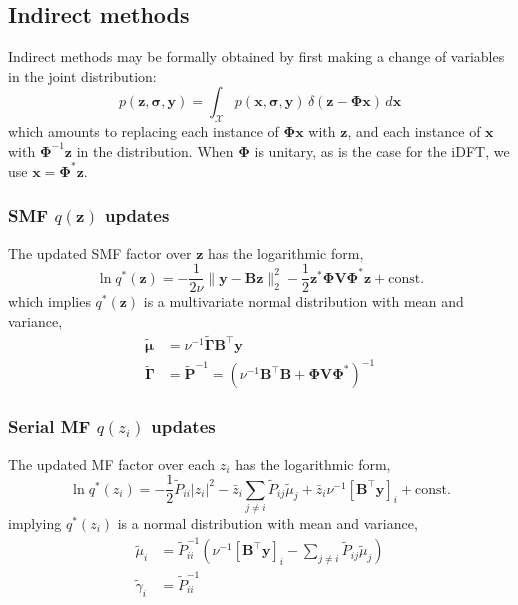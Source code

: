 \documentclass{article}
\newcommand{\m}[1]{\boldsymbol{#1}}
\begin{document}
\subsection{Indirect methods}
\label{ss:var_indirect}
Indirect methods may be formally obtained by first making a change of
variables in the joint distribution:
\begin{equation}
p(\m{z}, \m{\sigma}, \m{y}) = \int_{\mathcal{X}}
 p(\m{x}, \m{\sigma}, \m{y}) \, \delta(\m{z} - \m{\Phi} \m{x}) \, d\m{x}
\label{eq:x_to_z}
\end{equation}
which amounts to replacing each instance of $\m{\Phi} \m{x}$ with $\m{z}$,
and each instance of $\m{x}$ with $\m{\Phi}^{-1} \m{z}$ in the distribution.
When $\m{\Phi}$ is unitary, as is the case for the iDFT, we use
$\m{x} = \m{\Phi}^* \m{z}$.

\subsubsection{SMF $q(\m{z})$ updates}
The updated SMF factor over $\m{z}$ has the logarithmic form,
\begin{equation*}
\ln q^*(\m{z}) =
 -\frac{1}{2 \nu} \| \m{y} - \m{B} \m{z} \|_2^2
 -\frac{1}{2} \m{z}^* \m{\Phi} \m{V} \m{\Phi}^* \m{z}
 +\text{const.}
\end{equation*}
which implies $q^*(\m{z})$ is a multivariate normal distribution
with mean and variance,
\begin{equation*}
\begin{aligned}
\m{\tilde\mu} &= \nu^{-1} \m{\tilde\Gamma} \m{B}^\top \m{y}
\\
\m{\tilde\Gamma} &=
 \m{\tilde P}^{-1} = \left(
  \nu^{-1} \m{B}^\top \m{B} + \m{\Phi} \m{V} \m{\Phi}^*
 \right)^{-1}
\end{aligned}
\end{equation*}

\subsubsection{Serial MF $q(z_i)$ updates}
The updated MF factor over each $z_i$ has the logarithmic form,
\begin{equation*}
\ln q^*(z_i) =
 -\frac{1}{2} \tilde{P}_{ii} |z_i|^2
 -\bar{z}_i \sum_{j \ne i} \tilde{P}_{ij} \tilde\mu_j
 +\bar{z}_i \nu^{-1} \left[ \m{B}^\top \m{y} \right]_i
 +\text{const.}
\end{equation*}
implying $q^*(z_i)$ is a normal distribution with mean and variance,
\begin{equation*}
\begin{aligned}
\tilde\mu_i &=
 \tilde{P}_{ii}^{-1} \left(
  \nu^{-1} \left[ \m{B}^\top \m{y} \right]_i -
  {\textstyle\sum}_{j \ne i} \tilde{P}_{ij} \tilde\mu_j
 \right)
\\
\tilde\gamma_i &= \tilde{P}_{ii}^{-1}
\end{aligned}
\end{equation*}
\end{document}
